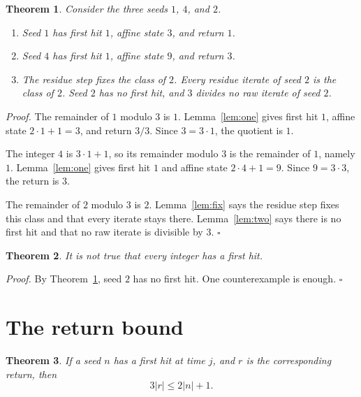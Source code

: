 \documentclass[11pt,letterpaper]{article}
\newtheorem{theorem}{Theorem}
\newenvironment{proof}{\noindent\textit{Proof.}}{\hfill\(\square\)}
\begin{document}
\begin{theorem}
\label{thm:seeds}
Consider the three seeds \(1\), \(4\), and \(2\).
\begin{enumerate}[label=\textup{(\roman*)}]
\item Seed \(1\) has first hit \(1\), affine state \(3\), and return \(1\).
\item Seed \(4\) has first hit \(1\), affine state \(9\), and return \(3\).
\item The residue step fixes the class of \(2\). Every residue iterate of seed \(2\) is the class of \(2\). Seed \(2\) has no first hit, and \(3\) divides no raw iterate of seed \(2\).
\end{enumerate}
\end{theorem}

\begin{proof}
The remainder of \(1\) modulo \(3\) is \(1\). Lemma~\ref{lem:one} gives first hit \(1\), affine state \(2\cdot 1+1=3\), and return \(3/3\). Since \(3=3\cdot 1\), the quotient is \(1\).

The integer \(4\) is \(3\cdot 1+1\), so its remainder modulo \(3\) is the remainder of \(1\), namely \(1\). Lemma~\ref{lem:one} gives first hit \(1\) and affine state \(2\cdot 4+1=9\). Since \(9=3\cdot 3\), the return is \(3\).

The remainder of \(2\) modulo \(3\) is \(2\). Lemma~\ref{lem:fix} says the residue step fixes this class and that every iterate stays there. Lemma~\ref{lem:two} says there is no first hit and that no raw iterate is divisible by \(3\).
\end{proof}

\begin{theorem}
\label{thm:nototal}
It is not true that every integer has a first hit.
\end{theorem}

\begin{proof}
By Theorem~\ref{thm:seeds}, seed \(2\) has no first hit. One counterexample is enough.
\end{proof}

\section{The return bound}

\begin{theorem}
\label{thm:bound}
If a seed \(n\) has a first hit at time \(j\), and \(r\) is the corresponding return, then
\[
  3\lvert r\rvert\le 2\lvert n\rvert+1.
\]
\end{theorem}
\end{document}
